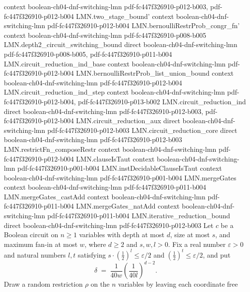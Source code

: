 \begin{theorem}
  {context}
  {boolean-ch04-dnf-switching-lmn}
  {pdf-fc447f326910-p012-b003,
    pdf-fc447f326910-p012-b004}
\proofstep
  {LMN.two_stage_bound'}
  {context}
  {boolean-ch04-dnf-switching-lmn}
  {pdf-fc447f326910-p012-b004}
\proofstep
  {LMN.bernoulliRestrProb_congr_fn'}
  {context}
  {boolean-ch04-dnf-switching-lmn}
  {pdf-fc447f326910-p008-b005}
\proofstep
  {LMN.depth2_circuit_switching_bound}
  {direct}
  {boolean-ch04-dnf-switching-lmn}
  {pdf-fc447f326910-p008-b005,
    pdf-fc447f326910-p011-b004}
\proofstep
  {LMN.circuit_reduction_ind_base}
  {context}
  {boolean-ch04-dnf-switching-lmn}
  {pdf-fc447f326910-p012-b004}
\proofstep
  {LMN.bernoulliRestrProb_list_union_bound}
  {context}
  {boolean-ch04-dnf-switching-lmn}
  {pdf-fc447f326910-p012-b004}
\proofstep
  {LMN.circuit_reduction_ind_step}
  {context}
  {boolean-ch04-dnf-switching-lmn}
  {pdf-fc447f326910-p012-b004,
    pdf-fc447f326910-p013-b002}
\proofstep
  {LMN.circuit_reduction_ind}
  {direct}
  {boolean-ch04-dnf-switching-lmn}
  {pdf-fc447f326910-p012-b003,
    pdf-fc447f326910-p012-b004}
\proofstep
  {LMN.circuit_reduction_aux}
  {direct}
  {boolean-ch04-dnf-switching-lmn}
  {pdf-fc447f326910-p012-b003}
\proofstep
  {LMN.circuit_reduction_core}
  {direct}
  {boolean-ch04-dnf-switching-lmn}
  {pdf-fc447f326910-p012-b003}
\proofstep
  {LMN.restrictFn_composeRestr}
  {context}
  {boolean-ch04-dnf-switching-lmn}
  {pdf-fc447f326910-p012-b004}
\proofstep
  {LMN.clauseIsTaut}
  {context}
  {boolean-ch04-dnf-switching-lmn}
  {pdf-fc447f326910-p001-b004}
\proofstep
  {LMN.instDecidableClauseIsTaut}
  {context}
  {boolean-ch04-dnf-switching-lmn}
  {pdf-fc447f326910-p001-b004}
\proofstep
  {LMN.mergeGates}
  {context}
  {boolean-ch04-dnf-switching-lmn}
  {pdf-fc447f326910-p011-b004}
\proofstep
  {LMN.mergeGates_castAdd}
  {context}
  {boolean-ch04-dnf-switching-lmn}
  {pdf-fc447f326910-p011-b004}
\proofstep
  {LMN.mergeGates_natAdd}
  {context}
  {boolean-ch04-dnf-switching-lmn}
  {pdf-fc447f326910-p011-b004}
\proofstep
  {LMN.iterative_reduction_bound}
  {direct}
  {boolean-ch04-dnf-switching-lmn}
  {pdf-fc447f326910-p012-b003}
Let $c$ be a Boolean circuit on $n \ge 1$ variables with depth at most $d$, size at most
$s$, and maximum fan-in at most $w$, where $d \ge 2$ and $s, w, l > 0$. Fix a real
number $\varepsilon > 0$ and natural numbers $l, t$ satisfying $s \cdot
\left(\tfrac{1}{2}\right)^{l} \le \varepsilon/2$ and $\left(\tfrac{1}{2}\right)^{t} \le
\varepsilon/2$, and put
\[
  \delta \;=\; \frac{1}{40w}\left(\frac{1}{40l}\right)^{d-2}.
\]
Draw a random restriction $\rho$ on the $n$ variables by leaving each coordinate free

\end{theorem}

